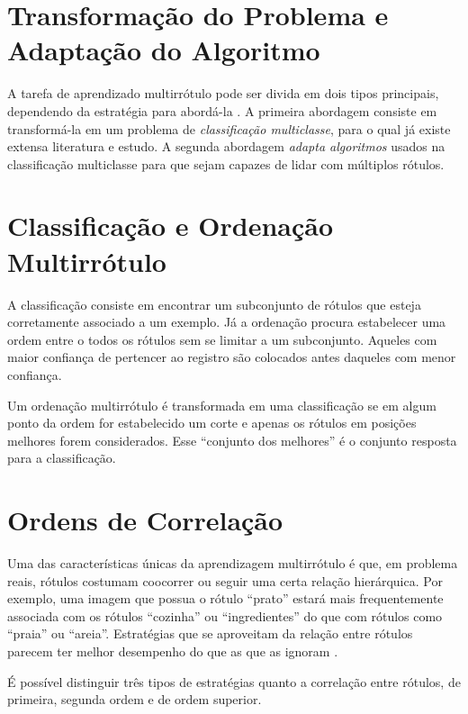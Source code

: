 \documentclass[runningheads,a4paper]{llncs}
\begin{document}
\section{Transformação do Problema e Adaptação do Algoritmo}

A tarefa de aprendizado multirrótulo pode ser divida em dois tipos principais, dependendo da estratégia para abordá-la \cite{Tsoumakas2009-vw}. A primeira abordagem consiste em transformá-la em um problema de \textit{classificação multiclasse}, para o qual já existe extensa literatura e estudo. A segunda abordagem \textit{adapta algoritmos} usados na classificação multiclasse para que sejam capazes de lidar com múltiplos rótulos.

\section{Classificação e Ordenação Multirrótulo} \label{sec:classord}

A classificação consiste em encontrar um subconjunto de rótulos que esteja corretamente associado a um exemplo. Já a ordenação procura estabelecer uma ordem entre o todos os rótulos sem se limitar a um subconjunto. Aqueles com maior confiança de pertencer ao registro são colocados antes daqueles com menor confiança.

Um ordenação multirrótulo é transformada em uma classificação se em algum ponto da ordem for estabelecido um corte e apenas os rótulos em posições melhores forem considerados. Esse \enquote{conjunto dos melhores} é o conjunto resposta para a classificação.

\section{Ordens de Correlação}

Uma das características únicas da aprendizagem multirrótulo é que, em problema reais, rótulos costumam coocorrer ou seguir uma certa relação hierárquica. Por exemplo, uma imagem que possua o rótulo \enquote{prato} estará mais frequentemente associada com os rótulos \enquote{cozinha} ou \enquote{ingredientes} do que com rótulos como \enquote{praia} ou \enquote{areia}. Estratégias que se aproveitam da relação entre rótulos parecem ter melhor desempenho do que as que as ignoram \cite{Zhang2010-ee}.

É possível distinguir três tipos de estratégias quanto a correlação entre rótulos, de primeira, segunda ordem e de ordem superior.
\end{document}
